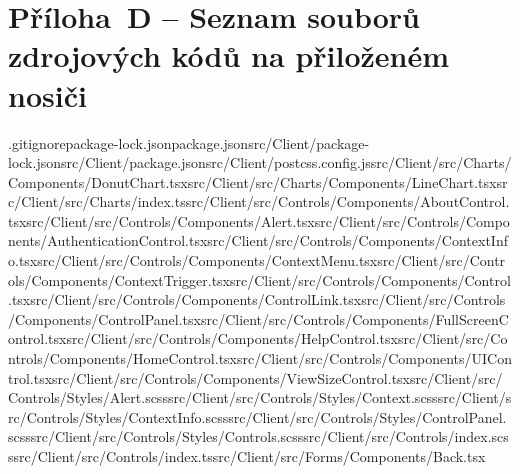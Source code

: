 \documentclass[a4paper,12pt]{article}
\begin{document}
\clearpage {}\label{prilohaD} 

\section*{Příloha~D --  Seznam souborů zdrojových kódů na přiloženém nosiči}

.gitignore\newline package-lock.json\newline package.json\newline src/Client/package-lock.json\newline src/Client/package.json\newline src/Client/postcss.config.js\newline src/Client/src/Charts/Components/DonutChart.tsx\newline src/Client/src/Charts/Components/LineChart.tsx\newline src/Client/src/Charts/index.ts\newline src/Client/src/Controls/Components/AboutControl.tsx\newline src/Client/src/Controls/Components/Alert.tsx\newline src/Client/src/Controls/Components/AuthenticationControl.tsx\newline src/Client/src/Controls/Components/ContextInfo.tsx\newline src/Client/src/Controls/Components/ContextMenu.tsx\newline src/Client/src/Controls/Components/ContextTrigger.tsx\newline src/Client/src/Controls/Components/Control.tsx\newline src/Client/src/Controls/Components/ControlLink.tsx\newline src/Client/src/Controls/Components/ControlPanel.tsx\newline src/Client/src/Controls/Components/FullScreenControl.tsx\newline src/Client/src/Controls/Components/HelpControl.tsx\newline src/Client/src/Controls/Components/HomeControl.tsx\newline src/Client/src/Controls/Components/UIControl.tsx\newline src/Client/src/Controls/Components/ViewSizeControl.tsx\newline src/Client/src/Controls/Styles/Alert.scss\newline src/Client/src/Controls/Styles/Context.scss\newline src/Client/src/Controls/Styles/ContextInfo.scss\newline src/Client/src/Controls/Styles/ControlPanel.scss\newline src/Client/src/Controls/Styles/Controls.scss\newline src/Client/src/Controls/index.scss\newline src/Client/src/Controls/index.ts\newline src/Client/src/Forms/Components/Back.tsx\newline 
\end{document}

